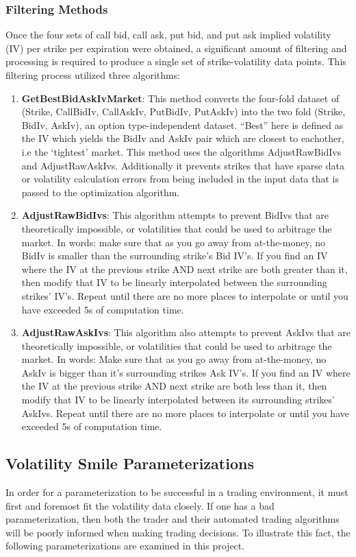 \documentclass[12pt, a4paper, notitlepage]{article}
\numberwithin{equation}{subsection}
\numberwithin{figure}{subsection}
\numberwithin{table}{subsection}
\begin{document}
\subsubsection{Filtering Methods}\label{sec:FilteringMethods}
Once the four sets of call bid, call ask, put bid, and put ask implied volatility (IV) per strike per expiration were obtained, a significant amount of filtering and processing is required to produce a single set of strike-volatility data points.  This filtering process utilized three algorithms:

\begin{enumerate}
	\item \textbf{GetBestBidAskIvMarket}:  This method converts the four-fold dataset of (Strike, CallBidIv, CallAskIv, PutBidIv, PutAskIv) into the two fold (Strike, BidIv, AskIv), an option type-independent dataset.  ``Best'' here is defined as the IV which yields the BidIv and AskIv pair which are closest to eachother, i.e the `tightest' market.  This method uses the algorithms AdjustRawBidIvs and AdjustRawAskIvs.  Additionally it prevents strikes that have sparse data or volatility calculation errors from being included in the input data that is passed to the optimization algorithm.
    \item \textbf{AdjustRawBidIvs}: This algorithm attempts to prevent BidIvs that are theoretically impossible, or volatilities that could be used to arbitrage the market.  In words: make sure that as you go away from at-the-money, no BidIv is smaller than the surrounding strike's Bid IV's.  If you find an IV where the IV at the previous strike AND next strike are both greater than it, then modify that IV to be linearly interpolated between the surrounding strikes' IV's.  Repeat until there are no more places to interpolate or until you have exceeded 5s of computation time.
    \item \textbf{AdjustRawAskIvs}:  This algorithm also attempts to prevent AskIvs that are theoretically impossible, or volatilities that could be used to arbitrage the market.  In words: Make sure that as you go away from at-the-money, no AskIv is bigger than it's surrounding strikes Ask IV's.  If you find an IV where the IV at the previous strike AND next strike are both less than it, then modify that IV to be linearly interpolated between its surrounding strikes' AskIvs.  Repeat until there are no more places to interpolate or until you have exceeded 5s of computation time.
\end{enumerate}

\subsection{Volatility Smile Parameterizations}\label{sec:VolSmileParameterizations}
In order for a parameterization to be successful in a trading environment, it must first and foremost fit the volatility data closely.  If one has a bad parameterization, then both the trader and their automated trading algorithms will be poorly informed when making trading decisions.  To illustrate this fact, the following parameterizations are examined in this project.
\end{document}
